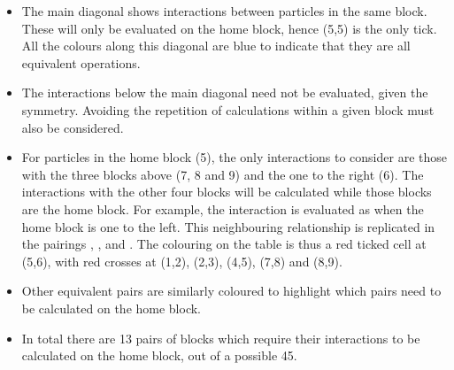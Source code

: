 \documentclass[paper=a4, fontsize=11pt,bibtotoc]{scrartcl}		%
\begin{document}
\begin{itemize}
	\item{The main diagonal shows interactions between particles in the same block. These will only be evaluated on the home block, hence (5,5) 
              is the only tick. All the colours along this diagonal are blue to indicate that they are all equivalent operations.}
	\item{The interactions below the main diagonal need not be evaluated, given the symmetry. Avoiding the repetition of calculations within a 
              given block must also be considered.} 
	\item{For particles in the home block (5), the only interactions to consider are those with the three blocks above (7, 8 and 9) and the one 
	      to the right (6). The interactions with the other four blocks will be calculated while those blocks are the home block. For example, 
              the interaction  is evaluated as  when the home block is one to the left. 
	      This neighbouring relationship is replicated in the pairings , ,  and .  The 
	      colouring on the table is thus a red ticked cell at (5,6), with red crosses at (1,2), (2,3), (4,5), (7,8) and (8,9).} 
	\item{Other equivalent pairs are similarly coloured to highlight which pairs need to be calculated on the home block.} 
	\item{In total there are 13 pairs of blocks which require their interactions to be calculated on the home block, out of a possible 45.} 
\end{itemize}
\end{document}
